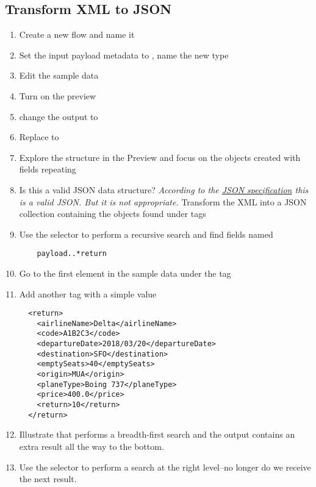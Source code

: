 \subsection{Transform XML to JSON}
\begin{enumerate}[resume*]
\item Create a new flow and name it 
\item Set the input payload metadata to , name the new type 
\item Edit the sample data
\item Turn on the preview
\item change the output to 
\item Replace \ttt{\{\}} to 
\item Explore the structure in the Preview and focus on the objects created with  fields repeating
\item Is this a valid JSON data structure?
  \newline
  \emph{
    According to the \href{https://www.ecma-international.org/publications/files/ECMA-ST/ECMA-404.pdf}{JSON specification} this is a valid JSON. But it is not appropriate.
  }
  \newline
  Transform the XML into a JSON collection containing the objects found under  tags
\item Use the  selector to perform a recursive search and find fields named 
  \begin{verbatim}
    payload..*return
  \end{verbatim}
\item Go to the first element in the sample data under the  tag
\item Add another  tag with a simple value
\begin{verbatim}
  <return>
    <airlineName>Delta</airlineName>
    <code>A1B2C3</code>
    <departureDate>2018/03/20</departureDate>
    <destination>SFO</destination>
    <emptySeats>40</emptySeats>
    <origin>MUA</origin>
    <planeType>Boing 737</planeType>
    <price>400.0</price>
    <return>10</return>
  </return>
\end{verbatim}
\item Illustrate that  performs a breadth-first search and the output contains an extra result all the way to the bottom. 
\item Use the  selector to perform a search at the right level--no longer do we receive the next  result. 

\end{enumerate}
